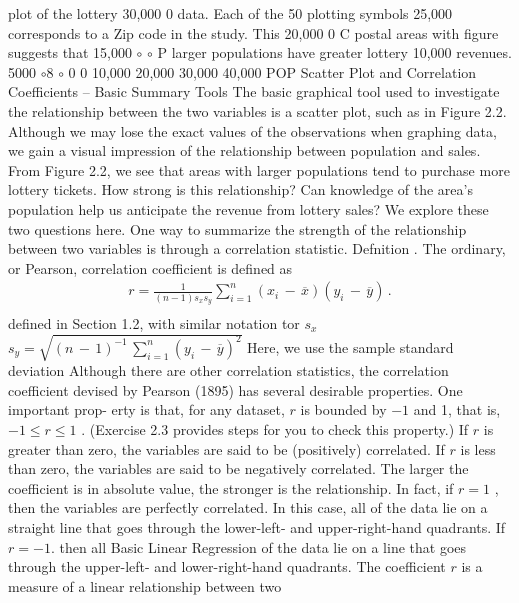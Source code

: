 \documentclass[11pt]{article}
\begin{document}
plot of the lottery
 30,000 0 data. Each of the 50
 plotting symbols
25,000 corresponds to a \(\mathrm{Z i p}\)
code in the study. This
 20,000 0 C postal areas with
figure suggests that
15,000 \(\circ\) \(\circ\) P larger populations
have greater lottery
10,000 revenues.
5000 \(\circ8\)
\(\circ\)
0
0 10,000 20,000 30,000 40,000
POP
 Scatter Plot and Correlation Coefficients -- Basic Summary Tools
The basic graphical tool used to investigate the relationship between the two
variables is a scatter plot, such as in Figure 2.2. Although we may lose the
 exact values of the observations when graphing data, we gain a visual impression
of the relationship between population and sales. From Figure 2.2, we see that
 areas with larger populations tend to purchase more lottery tickets. How strong
 is this relationship? Can knowledge of the area's population help us anticipate
the revenue from lottery sales? We explore these two questions here.
One way to summarize the strength of the relationship between two variables
 is through a correlation statistic.
Defnition . The ordinary, or Pearson, correlation coefficient is defined as
\[
\begin{aligned} {r=\frac{1} {( n-1 ) s_{x} s_{y}} \sum_{i=1}^{n} \left( x_{i} \,-\, \overline{{x}} \right) ( y_{i} \,-\, \overline{{y}} ) \, .} \\ \end{aligned}
\]
defined in Section 1.2, with similar notation tor \(s_{x}\) \(s_{y}=\sqrt{( n \,-\, 1 )^{-1} \, \sum_{i=1}^{n} \left( y_{i} \,-\, \overline{{y}} \right)^{2}}\)
Here, we use the sample standard deviation
Although there are other correlation statistics, the correlation coefficient
 devised by Pearson (1895) has several desirable properties. One important prop-
erty is that, for any dataset, \(r\) is bounded by \(- 1\) and 1, that is, \(- 1 \leq r \leq1\) .
(Exercise 2.3 provides steps for you to check this property.) If \(r\) is greater than
zero, the variables are said to be (positively) correlated. If \(r\) is less than zero,
 the variables are said to be negatively correlated. The larger the coefficient is in
 absolute value, the stronger is the relationship. In fact, if \(r=1\) , then the variables
are perfectly correlated. In this case, all of the data lie on a straight line that
 goes through the lower-left- and upper-right-hand quadrants. If \(r=-1 .\) then all
 Basic Linear Regression
 of the data lie on a line that goes through the upper-left- and lower-right-hand
quadrants. The coefficient \(r\) is a measure of a linear relationship between two
\end{document}
